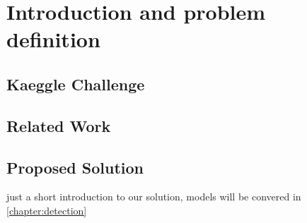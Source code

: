 \chapter{Introduction and problem definition}\label{chapter:intro}

\section{Kaeggle Challenge}

\section{Related Work}

\section{Proposed Solution}
just a short introduction to our solution, models will be convered in \vref{chapter:detection}